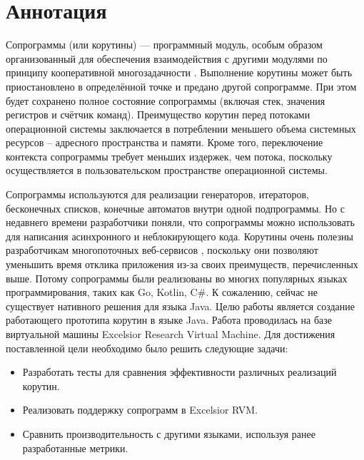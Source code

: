 \section{Аннотация}

Сопрограммы (или корутины) — программный модуль, особым образом организованный для обеспечения взаимодействия с другими модулями по принципу кооперативной многозадачности \cite{coroutine}. Выполнение корутины может быть приостановлено в определённой точке и предано другой сопрограмме. 
При этом будет сохранено полное состояние сопрограммы (включая стек, значения регистров и счётчик команд). 
Преимущество корутин перед потоками операционной системы заключается в потреблении меньшего объема системных ресурсов – адресного
пространства и памяти. Кроме того, переключение контекста сопрограммы требует меньших издержек, чем потока, поскольку осуществляется в пользовательском пространстве операционной системы. 
\par
Сопрограммы используются для реализации генераторов, итераторов, бесконечных списков, конечные автоматов внутри одной
подпрограммы. Но с недавнего времени разработчики поняли, что сопрограммы можно использовать для написания
асинхронного и неблокирующего кода. Корутины очень полезны разработчикам многопоточных веб-сервисов , поскольку они 
позволяют уменьшить время отклика приложения из-за своих преимуществ, перечисленных выше. Потому сопрограммы 
были реализованы во многих популярных языках программирования, таких как Go, Kotlin, C\#.
К сожалению, сейчас не существует нативного решения для языка Java.
Целю работы является создание работающего прототипа корутин в языке Java. Работа проводилась на базе виртуальной машины Excelsior Research Virtual Machine. Для достижения поставленной цели необходимо было решить следующие задачи:
\begin{itemize}
	\item Разработать тесты для сравнения эффективности различных реализаций корутин.
	\item Реализовать поддержку сопрограмм в Excelsior RVM. 
	\item Сравнить производительность с другими языками, используя ранее разработанные метрики.
\end{itemize}

\clearpage

